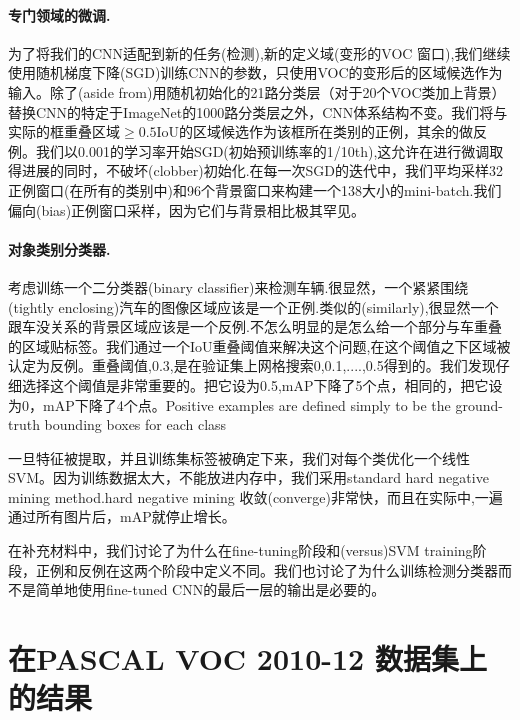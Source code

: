 \documentclass[a4paper,UTF8]{ctexart}
\theoremstyle{definition}
\begin{document}
\paragraph{专门领域的微调.}为了将我们的CNN适配到新的任务(检测),新的定义域(变形的VOC 窗口),我们继续使用随机梯度下降(SGD)训练CNN的参数，只使用VOC的变形后的区域候选作为输入。除了(aside from)用随机初始化的21路分类层（对于20个VOC类加上背景）替换CNN的特定于ImageNet的1000路分类层之外，CNN体系结构不变。我们将与实际的框重叠区域$\geq 0.5$IoU的区域候选作为该框所在类别的正例，其余的做反例。我们以0.001的学习率开始SGD(初始预训练率的1/10th),这允许在进行微调取得进展的同时，不破坏(clobber)初始化.在每一次SGD的迭代中，我们平均采样32正例窗口(在所有的类别中)和96个背景窗口来构建一个138大小的mini-batch.我们偏向(bias)正例窗口采样，因为它们与背景相比极其罕见。

\paragraph{对象类别分类器.}考虑训练一个二分类器(binary classifier)来检测车辆.很显然，一个紧紧围绕(tightly enclosing)汽车的图像区域应该是一个正例.类似的(similarly),很显然一个跟车没关系的背景区域应该是一个反例.不怎么明显的是怎么给一个部分与车重叠的区域贴标签。我们通过一个IoU重叠阈值来解决这个问题,在这个阈值之下区域被认定为反例。重叠阈值,0.3,是在验证集上网格搜索{0,0.1,....,0.5}得到的。我们发现仔细选择这个阈值是非常重要的。把它设为0.5,mAP下降了5个点，相同的，把它设为0，mAP下降了4个点。Positive examples are defined simply to be the ground-truth bounding boxes for each class

一旦特征被提取，并且训练集标签被确定下来，我们对每个类优化一个线性SVM。因为训练数据太大，不能放进内存中，我们采用standard hard negative mining method.hard negative mining 收敛(converge)非常快，而且在实际中,一遍通过所有图片后，mAP就停止增长。

在补充材料中，我们讨论了为什么在fine-tuning阶段和(versus)SVM training阶段，正例和反例在这两个阶段中定义不同。我们也讨论了为什么训练检测分类器而不是简单地使用fine-tuned CNN的最后一层的输出是必要的。
\section{在PASCAL VOC 2010-12 数据集上的结果}
\end{document}
